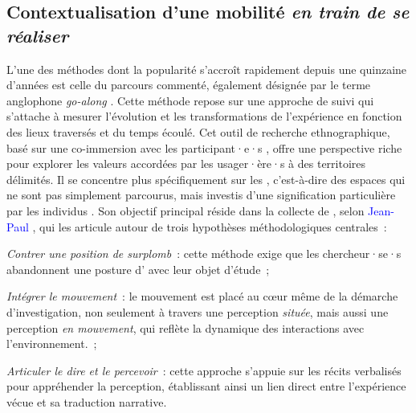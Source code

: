 \begin{refsegment}
\subsection{Contextualisation d'une mobilité \textsl{en train de se réaliser}
    \label{chap3:parcours-commente-definition}
    }

L’une des méthodes  dont la popularité s’accroît rapidement depuis une quinzaine d’années est celle du parcours commenté, également désignée par le terme anglophone \textsl{go-along} \textcolor{blue}{\autocite[3]{despres_replacer_2019}}. Cette méthode repose sur une approche de suivi qui s’attache à mesurer l’évolution et les transformations de l’expérience en fonction des lieux traversés et du temps écoulé. Cet outil de recherche ethnographique, basé sur une co-immersion avec les participant·e·s \textcolor{blue}{\autocite[456]{kusenbach_street_2003}}, offre une perspective riche pour explorer les valeurs accordées par les usager·ère·s à des territoires délimités. Il se concentre plus spécifiquement sur les , c’est-à-dire des espaces qui ne sont pas simplement parcourus, mais investis d’une signification particulière par les individus \textcolor{blue}{\autocite[]{fremont_region_1976}}. Son objectif principal réside dans la collecte de , selon \textcolor{blue}{Jean-Paul} \textcolor{blue}{\textcite[83-85]{thibaud_methode_2001}}, qui les articule autour de trois hypothèses méthodologiques centrales~:
    \begin{customitemize}
\item \textsl{Contrer une position de surplomb}~: cette méthode exige que les chercheur·se·s abandonnent une posture d' avec leur objet d'étude~;
\item \textsl{Intégrer le mouvement}~: le mouvement est placé au cœur même de la démarche d’investigation, non seulement à travers une perception \textsl{située}, mais aussi une perception \textsl{en mouvement}, qui reflète la dynamique des interactions avec l’environnement.~;
\item \textsl{Articuler le \textsl{dire} et le \textsl{percevoir}}~: cette approche s’appuie sur les récits verbalisés pour appréhender la perception, établissant ainsi un lien direct entre l’expérience vécue et sa traduction narrative.
    \end{customitemize}%


\end{refsegment}

